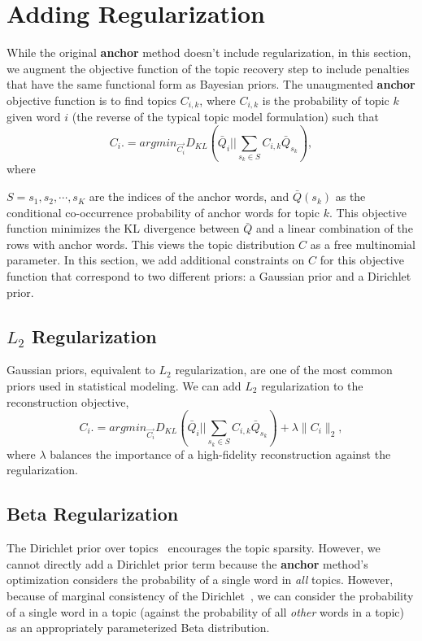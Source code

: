 \documentclass{article}
\begin{document}
\section{Adding Regularization}
\label{sec:prior}

While the original {\bf anchor} method doesn't include regularization, in this
section, we augment the objective function of the topic recovery step to include
penalties that have the same functional form as Bayesian priors.  The
unaugmented {\bf anchor} objective function is to find topics $C_{i,k}$, where
$C_{i,k}$ is the probability of topic $k$ given word $i$ (the reverse of the
typical topic model formulation) such that
\begin{equation}
\label{eq:anchor}
C_i. = argmin_{\vec{C_i}} D_{KL}\left( \bar{Q}_i || \sum_{s_k \in S} C_{i,k} \bar{Q}_{s_k} \right),
\end{equation}
where 


$S = {s_1, s_2, \cdots, s_K}$ are the indices of the anchor words, and $\bar{Q}(s_k)$ as
the conditional co-occurrence probability of anchor words for topic $k$.  This
objective function minimizes the KL divergence between $\bar{Q}$ and a linear 
combination of the rows with anchor words.
This views the topic distribution $C$ as a free multinomial parameter.  In this
section, we add additional constraints on $C$ for this objective function that
correspond to two different priors: a Gaussian prior and a Dirichlet prior.

\subsection{$L_2$ Regularization}
\label{sec:l2}

Gaussian priors, equivalent to $L_2$ regularization, are one of the most common
priors used in statistical modeling.  We can add $L_2$ regularization to the
reconstruction objective,
\begin{equation}
\label{eq:anchorl2}
C_i. = argmin_{\vec{C_i}} D_{KL}(\bar{Q}_i || \sum_{s_k \in S} C_{i,k} \bar{Q}_{s_k}) +\lambda \|C_i\|_2,
\end{equation}
where $\lambda$ balances the importance of a high-fidelity reconstruction
against the regularization.

\subsection{Beta Regularization}
\label{sec:beta}

The Dirichlet prior over topics~\cite{blei-03} encourages the topic sparsity.
However, we cannot directly add a Dirichlet prior term because the {\bf anchor}
method's optimization considers the probability of a single word in \emph{all}
topics.  However, because of marginal consistency of the
Dirichlet~\cite{sethuraman-94}, we can consider the probability of a single word
in a topic (against the probability of all \emph{other} words in a topic) as an
appropriately parameterized Beta distribution.
\end{document}
